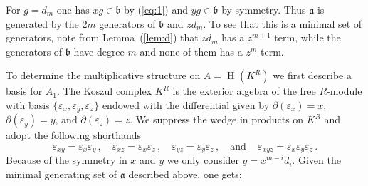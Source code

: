 \documentclass{amsart}
\theoremstyle{bfupright head,upright body}
\theoremstyle{fixed bf head,slanted body}
\theoremstyle{fixed bf head,upright body}
\theoremstyle{numbered paragraph}
\newenvironment{prf*}[1][Proof]{%
  \begin{proof}[\bf #1]
    \setcounter{equation}{0}
    \renewcommand{\theequation}{\arabic{equation}}}
  {\end{proof}
}
\renewcommand{\eqref}[1]{\pgref{eq:#1}}
\newcommand{\pgref}[1]{(\ref{#1})}
\newcommand{\lemref}[2][Lemma~]{#1\pgref{lem:#2}}
\newcommand{\set}[2][\mspace{1mu}]{\{#1 #2 #1\}}
\newcommand{\qtext}[1]{\quad\text{#1}\quad}
\newcommand{\qand}{\qtext{and}}
\renewcommand{\H}[2][]{\operatorname{H}_{#1}(#2)}
\newcommand{\e}[1]{\varepsilon_{#1}}
\newcommand{\fa}{\mathfrak{a}}
\newcommand{\fb}{\mathfrak{b}}
\numberwithin{equation}{res}
\begin{document}
\begin{prf*}
  For $g=d_m$ one has $xg \in \fb$ by \eqref{1} and $yg \in \fb$ by
  symmetry.  Thus $\fa$ is generated by the $2m$ generators of $\fb$
  and $zd_m$. To see that this is a minimal set of generators, note
  from \lemref{d} that $zd_m$ has a $z^{m+1}$ term, while the
  generators of $\fb$ have degree $m$ and none of them has a $z^m$
  term.

  To determine the multiplicative structure on $A = \H[]{K^R}$ we
  first describe a basis for $A_1$. The Koszul complex $K^R$ is the
  exterior algebra of the free $R$-module with basis $\set{\e{x},
    \e{y}, \e{z}}$ endowed with the differential given by
  $\partial(\e{x}) = x$, $\partial(\e{y}) = y$, and $\partial(\e{z}) =
  z$. We suppress the wedge in products on $K^R$ and adopt the
  following shorthands
  \begin{equation*}
    \e{xy} = \e{x}\e{y}\,,\quad
    \e{xz} = \e{x}\e{z}\,, \quad
    \e{yz} = \e{y}\e{z}\,,\qand\, \e{xyz} = \e{x}\e{y}\e{z}\,.
  \end{equation*}
  Because of the symmetry in $x$ and $y$ we only consider
  $g=x^{m-i}d_i$. Given the minimal generating set of $\fa$ described
  above, one gets:


\end{prf*}
\end{document}
